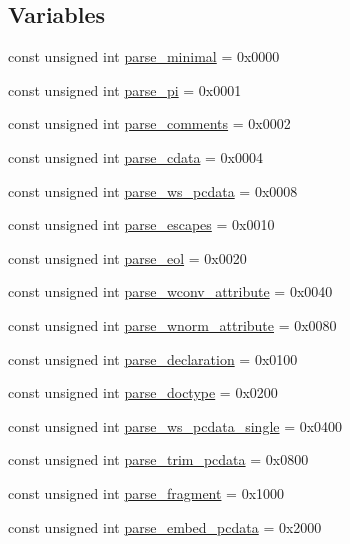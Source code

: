 \subsection*{Variables}
\begin{DoxyCompactItemize}
\item 
const unsigned int \hyperlink{namespacepugi_ae5058761cfd25d6cdb7e092659dae1fd}{parse\+\_\+minimal} = 0x0000
\item 
const unsigned int \hyperlink{namespacepugi_a8fb7ea408d60b4f2ca79dd30b651f545}{parse\+\_\+pi} = 0x0001
\item 
const unsigned int \hyperlink{namespacepugi_adcab316176bfaf69158339962fb4ad38}{parse\+\_\+comments} = 0x0002
\item 
const unsigned int \hyperlink{namespacepugi_a47b679897f8bc15e4e152978fc88c208}{parse\+\_\+cdata} = 0x0004
\item 
const unsigned int \hyperlink{namespacepugi_ae492a24302294f1ce3fbd56f2edbf131}{parse\+\_\+ws\+\_\+pcdata} = 0x0008
\item 
const unsigned int \hyperlink{namespacepugi_ab5ef8454110599611900ff48012c8ad6}{parse\+\_\+escapes} = 0x0010
\item 
const unsigned int \hyperlink{namespacepugi_ad4e017365d2ff3ee04e226c35129b475}{parse\+\_\+eol} = 0x0020
\item 
const unsigned int \hyperlink{namespacepugi_a1e943812f2de36fc3ee14f7756afdbd7}{parse\+\_\+wconv\+\_\+attribute} = 0x0040
\item 
const unsigned int \hyperlink{namespacepugi_a8617ea5ba78c676aff8b7af960cb2f4b}{parse\+\_\+wnorm\+\_\+attribute} = 0x0080
\item 
const unsigned int \hyperlink{namespacepugi_adb5db03ce720dcd90e900b9bb7e70427}{parse\+\_\+declaration} = 0x0100
\item 
const unsigned int \hyperlink{namespacepugi_afa993ffcd3e228d21f48071e7c097f32}{parse\+\_\+doctype} = 0x0200
\item 
const unsigned int \hyperlink{namespacepugi_ae7c892ad8288b363daca0c3e1a8e38ee}{parse\+\_\+ws\+\_\+pcdata\+\_\+single} = 0x0400
\item 
const unsigned int \hyperlink{namespacepugi_a1bc8f34cf3cf5fb2dd350293c0ecc5e3}{parse\+\_\+trim\+\_\+pcdata} = 0x0800
\item 
const unsigned int \hyperlink{namespacepugi_a79d7a2d2a9899d79abe6e06fdaa2134f}{parse\+\_\+fragment} = 0x1000
\item 
const unsigned int \hyperlink{namespacepugi_a80a72fa1dbed77775ec0498b23246d8d}{parse\+\_\+embed\+\_\+pcdata} = 0x2000

\end{DoxyCompactItemize}
